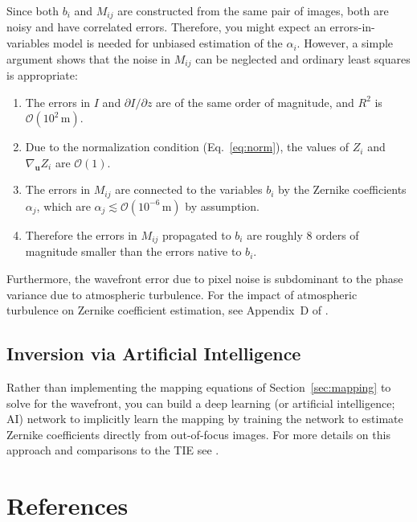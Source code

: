 \documentclass[TS,authoryear,toc]{lsstdoc}
\begin{document}
Since both $b_i$ and $M_{ij}$ are constructed from the same pair of images, both are noisy and have correlated errors.
Therefore, you might expect an errors-in-variables model is needed for unbiased estimation of the $\alpha_i$.
However, a simple argument shows that the noise in $M_{ij}$ can be neglected and ordinary least squares is appropriate:
\begin{enumerate}
    \item The errors in $I$ and $\partial I / \partial z$ are of the same order of magnitude, and $R^2$ is $\mathcal{O}(10^2 \,\text{m})$.
    \item Due to the normalization condition (Eq.~\ref{eq:norm}), the values of $Z_i$ and $\nabla_\mathbf{u} Z_i$ are $\mathcal{O}(1)$.
    \item The errors in $M_{ij}$ are connected to the variables $b_i$ by the Zernike coefficients $\alpha_j$, which are  $\alpha_j \lesssim \mathcal{O}(10^{-6} \,\text{m})$ by assumption.
    \item Therefore the errors in $M_{ij}$ propagated to $b_i$ are roughly 8 orders of magnitude smaller than the errors native to $b_i$.
\end{enumerate}
Furthermore, the wavefront error due to pixel noise is subdominant to the phase variance due to atmospheric turbulence.
For the impact of atmospheric turbulence on Zernike coefficient estimation, see Appendix~D of \citet{2024AJ....167...86C}.


\subsection{Inversion via Artificial Intelligence}
\label{sec:ai}

Rather than implementing the mapping equations of Section~\ref{sec:mapping} to solve for the wavefront, you can build a deep learning (or artificial intelligence; AI) network to implicitly learn the mapping by training the network to estimate Zernike coefficients directly from out-of-focus images.
For more details on this approach and comparisons to the TIE see \citet{2024AJ....167...86C}.


\newpage


\section*{References} \label{sec:bib}
\vspace*{-1.5cm}
\renewcommand{\refname}{} %

\end{document}
